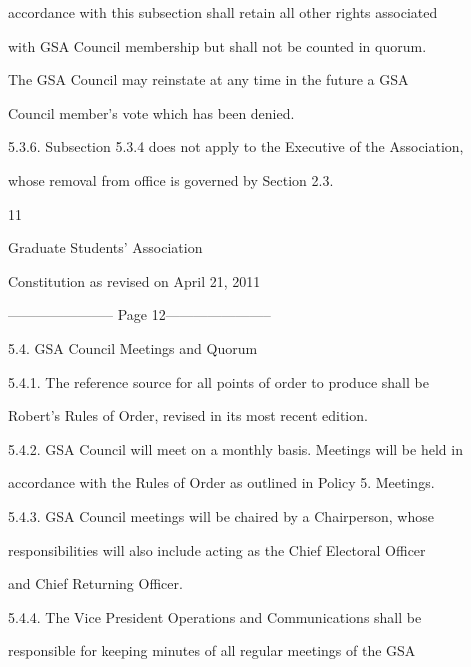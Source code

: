 \documentclass{article}
\begin{document}
accordance with this subsection shall retain all other rights associated  

with  GSA  Council  membership  but  shall  not  be  counted  in  quorum.  

The  GSA  Council  may  reinstate  at  any  time  in  the  future  a  GSA  

Council member's vote which has been denied.  



5.3.6.  Subsection 5.3.4 does  not  apply  to  the  Executive  of the  Association,  

whose removal from office is governed by Section 2.3.  



  



 

      11  



Graduate Students’ Association  



   Constitution as revised on April 21, 2011  


----------------------- Page 12-----------------------

  



5.4. GSA Council Meetings and Quorum  



5.4.1. The  reference  source  for  all  points  of  order  to  produce  shall  be  

Robert’s Rules of Order, revised in its most recent edition.  



5.4.2. GSA Council will meet on a monthly basis. Meetings will be held in  

accordance with the Rules of Order as outlined in Policy 5. Meetings.  



5.4.3. GSA  Council  meetings  will  be  chaired  by  a  Chairperson,  whose  

responsibilities will also include acting as the Chief Electoral Officer  

and Chief Returning Officer.  



5.4.4. The      Vice     President     Operations       and    Communications   shall   be  

responsible  for  keeping  minutes  of  all  regular  meetings  of  the  GSA  
\end{document}
